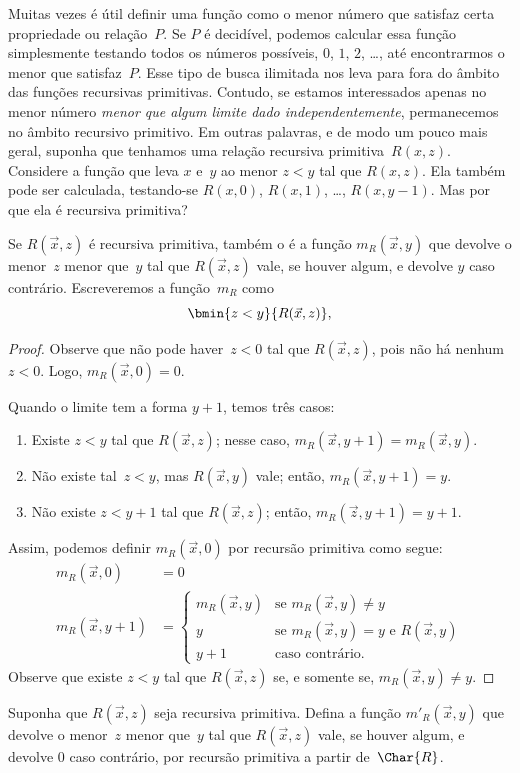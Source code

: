 \documentclass[../../../include/open-logic-section]{subfiles}
\begin{document}

\begin{explain}
Muitas vezes é útil definir uma função como o menor número que satisfaz certa
propriedade ou relação~$P$. Se $P$ é decidível, podemos calcular essa função
simplesmente testando todos os números possíveis, $0$, $1$, $2$, \dots, até
encontrarmos o menor que satisfaz~$P$. Esse tipo de busca ilimitada nos leva
para fora do âmbito das funções recursivas primitivas. Contudo, se estamos
interessados apenas no menor número \emph{menor que algum limite dado
independentemente}, permanecemos no âmbito recursivo primitivo. Em outras
palavras, e de modo um pouco mais geral, suponha que tenhamos uma relação
recursiva primitiva~$R(x,z)$. Considere a função que leva $x$ e~$y$ ao menor
$z < y$ tal que $R(x, z)$. Ela também pode ser calculada, testando-se
$R(x, 0)$, $R(x, 1)$, \dots, $R(x, y-1)$. Mas por que ela é recursiva
primitiva?
\end{explain}

\begin{prop}
Se $R(\vec x, z)$ é recursiva primitiva, também o é a função
$m_R(\vec{x}, y)$ que devolve o menor~$z$ menor que~$y$ tal que
$R(\vec x, z)$ vale, se houver algum, e devolve $y$ caso contrário.
Escreveremos a função~$m_R$ como
\[
\bmin{z < y}{R(\vec{x}, z)},
\]
\end{prop}

\begin{proof}
Observe que não pode haver~$z < 0$ tal que $R(\vec{x}, z)$, pois não há
nenhum $z < 0$. Logo, $m_R(\vec x, 0) = 0$.

Quando o limite tem a forma $y + 1$, temos três casos:
\begin{enumerate}
\item Existe $z < y$ tal que $R(\vec{x}, z)$; nesse caso,
$m_R(\vec{x}, y+1) = m_R(\vec{x}, y)$.
\item Não existe tal~$z<y$, mas $R(\vec{x}, y)$ vale; então,
$m_R(\vec{x}, y+1) = y$.
\item Não existe $z < y+1$ tal que $R(\vec{x}, z)$; então,
$m_R(\vec{z}, y+1) = y+1$.
\end{enumerate}
Assim, podemos definir $m_R(\vec x, 0)$ por recursão primitiva como segue:
\begin{align*}
m_R(\vec{x}, 0) & = 0\\
m_R(\vec{x}, y+1) & =
\begin{cases}
m_R(\vec{x}, y) & \text{se $m_R(\vec x, y) \neq y$}\\
y & \text{se $m_R(\vec x, y) = y$ e $R(\vec{x}, y)$}\\
y+1 & \text{caso contrário.}
\end{cases}
\end{align*}
Observe que existe $z<y$ tal que $R(\vec x, z)$ se, e somente se,
$m_R(\vec x, y) \neq y$.
\end{proof}

\begin{prob}
Suponha que $R(\vec x, z)$ seja recursiva primitiva. Defina a função
$m'_R(\vec{x}, y)$ que devolve o menor~$z$ menor que~$y$ tal que
$R(\vec{x}, z)$ vale, se houver algum, e devolve $0$ caso contrário, por
recursão primitiva a partir de~$\Char{R}$.
\end{prob}
\end{document}
